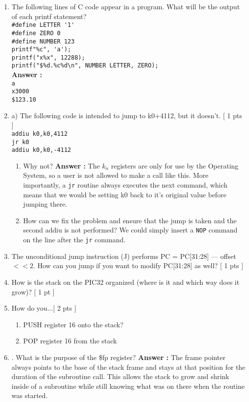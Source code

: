 \documentclass[a4paper,11pt]{article}
\newcommand{\answer}{\textbf{Answer : }}
\begin{document}
\begin{enumerate}
\item The following lines of C code appear in a program. What will be the output of each printf statement? \\
\verb.#define LETTER '1'.  \\
\verb.#define ZERO 0. \\
\verb.#define NUMBER 123 . \\
\verb.printf"%c", 'a'); .\\
\verb.printf("x%x", 12288); .\\
\verb_printf("$%d.%c%d\n", NUMBER LETTER, ZERO); _\\[.2in]
\answer \\
\verb.a. \\
\verb.x3000. \\
\verb_$123.10_ \\
\item a) The following code is intended to jump to k0+4112, but it doesn’t. [ 1 pts ] \\
\verb.addiu k0,k0,4112. \\
\verb.jr k0. \\
\verb.addiu k0,k0,-4112. \\
\begin{enumerate}
\item Why not? \answer The $k_n$ registers are only for use by the Operating System, so a user is not allowed to make a call like this. More importantly, a \verb.jr. routine always executes the next command, which means that we would be setting k0 back to it's original value before jumping there.
\item How can we fix the problem and ensure that the jump is taken and the second addiu is not performed? We could simply insert a \verb.NOP. command on the line after the \verb.jr. command.
\end{enumerate}

\item The unconditional jump instruction (J) performs PC = PC[31:28] — offset$<<2$. How can
you jump if you want to modify PC[31:28] as well? [ 1 pts ]
\item How is the stack on the PIC32 organized (where is it and which way does it grow)? [ 1 pt ]
\item How do you...[ 2 pts ]
\begin{enumerate}
\item PUSH register 16 onto the stack?
\item POP register 16 from the stack
\end{enumerate}
\item. What is the purpose of the \$fp register? \answer The frame pointer always points to the base of the stack frame and stays at that position for the duration of the subroutine call. This allows the stack to grow and shrink inside of a subroutine while still knowing what was on there when the routine was started. 


\end{enumerate}
\end{document}
